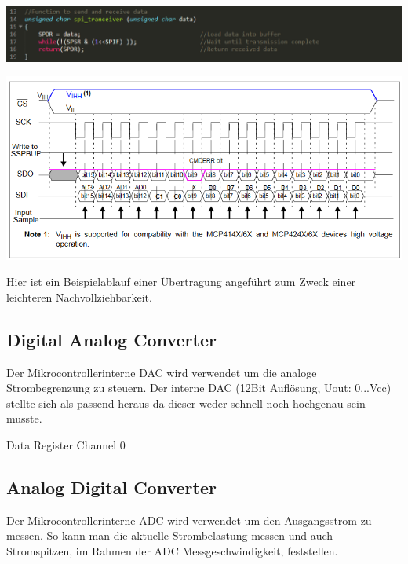 \documentclass[paper=a4, 12pt]{scrreprt}
\begin{document}
			\begin{adjustbox}{center,caption={while-Schleife abwarten, Zeile: 17},label={fig:while-Schleife abwarten, Zeile: 17},nofloat=figure,vspace=\bigskipamount}	
			\includegraphics[width=\textwidth]{img/SPITransmit.png}
			\end{adjustbox} \hfill \break
		
			\begin{adjustbox}{center,caption={SPI Protokoll des MCP4251},label={fig:SPIProtokoll},nofloat=figure,vspace=\bigskipamount}	
				\includegraphics[width=\textwidth]{img/SPI_Protokoll_MCP4251.png}
			\end{adjustbox} \hfill \break
			
			Hier ist ein Beispielablauf einer Übertragung angeführt zum Zweck einer leichteren Nachvollziehbarkeit.
			
		\subsection{Digital Analog Converter}\hfill \break
			Der Mikrocontrollerinterne DAC wird verwendet um die analoge Strombegrenzung zu steuern. Der interne DAC (12Bit Auflösung, Uout: 0...Vcc) stellte sich als passend heraus da dieser weder schnell noch hochgenau sein musste. 
			
			Data Register Channel 0 
		\subsection{Analog Digital Converter}\hfill \break
		Der Mikrocontrollerinterne ADC wird verwendet um den Ausgangsstrom zu messen. So kann man die aktuelle Strombelastung messen und auch Stromspitzen, im Rahmen der ADC Messgeschwindigkeit, feststellen.
		
\end{document}
